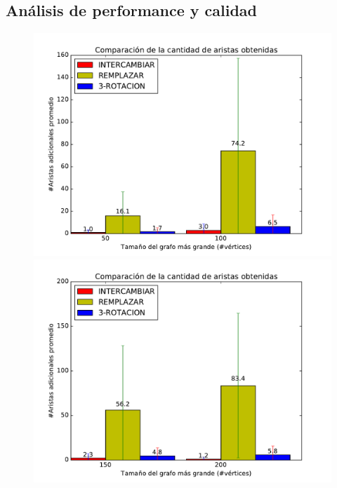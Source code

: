 \subsection{Análisis de performance y calidad}

\begin{figure}[H]
\centering
\begin{minipage}{0.49\textwidth}
  \centering
    \includegraphics[width=1\textwidth]{graficos/problema_6/calidad0.pdf}
  \caption{\footnotesize{}}
  \label{fig:calidad5-1}
\end{minipage}%
\hspace{0.01\textwidth}
\begin{minipage}{0.49\textwidth}   
  \centering
    \includegraphics[width=1\textwidth]{graficos/problema_6/calidad2.pdf} 
  \caption{\footnotesize{}}
  \label{fig:calidad5-2}
\end{minipage}


\end{figure}
